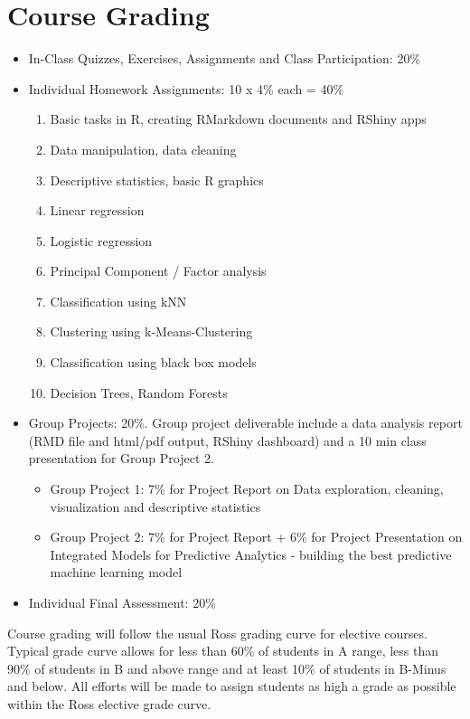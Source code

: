 \documentclass[10pt, letterpaper, twoside]{memoir}\usepackage{knitr}
\begin{document}
\section{Course Grading}
\begin{itemize}
\item In-Class Quizzes, Exercises, Assignments and Class Participation: 20\%

\item Individual Homework Assignments: 10 x 4\% each = 40\%
\begin{enumerate}
    \item Basic tasks in R, creating RMarkdown documents and RShiny apps
    \item Data manipulation, data cleaning
    \item Descriptive statistics, basic R graphics
    \item Linear regression
    \item Logistic regression
    \item Principal Component / Factor analysis
    \item Classification using kNN
    \item Clustering using k-Means-Clustering
    \item Classification using black box models
    \item Decision Trees, Random Forests
\end{enumerate}
\item Group Projects: 20\%. Group project deliverable include a data analysis report (RMD file and html/pdf output, RShiny dashboard) and a 10 min class presentation for Group Project 2.  
\begin{itemize}
    \item Group Project 1: 7\% for Project Report on Data exploration, cleaning, visualization and descriptive statistics
    \item Group Project 2: 7\% for Project Report + 6\% for Project Presentation on Integrated Models for Predictive Analytics - building the best predictive machine learning model
\end{itemize}    
\item Individual Final Assessment: 20\%
\end{itemize}    

Course grading will follow the usual Ross grading curve for elective courses. Typical grade curve allows for less than 60\% of students in A range, less than 90\% of students in B and above range and at least 10\% of students in B-Minus and below. All efforts will be made to assign students as high a grade as possible within the Ross elective grade curve.
\end{document}
